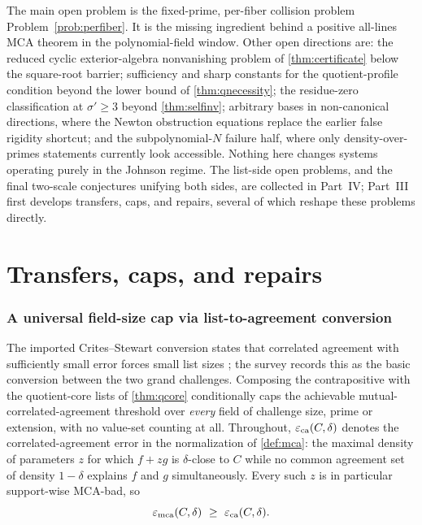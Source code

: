 \documentclass[11pt]{article}
\theoremstyle{definition}
\newcommand{\eps}{\varepsilon}
\newcommand{\emca}{\eps_{\rm mca}}
\newcommand{\eca}{\eps_{\rm ca}}
\begin{document}
The main open problem is the fixed-prime, per-fiber collision problem Problem~\ref{prob:perfiber}.  It is the missing ingredient behind a positive all-lines MCA theorem in the polynomial-field window.  Other open directions are: the reduced cyclic exterior-algebra nonvanishing problem of \cref{thm:certificate} below the square-root barrier; sufficiency and sharp constants for the quotient-profile condition beyond the lower bound of \cref{thm:qnecessity}; the residue-zero classification at $\sigma'\ge3$ beyond \cref{thm:selfinv}; arbitrary bases in non-canonical directions, where the Newton obstruction equations replace the earlier false rigidity shortcut; and the subpolynomial-$N$ failure half, where only density-over-primes statements currently look accessible.  Nothing here changes systems operating purely in the Johnson regime.  The list-side open problems, and the final two-scale conjectures unifying both sides, are collected in Part~IV; Part~III first develops transfers, caps, and repairs, several of which reshape these problems directly.

\part{Transfers, caps, and repairs}

\section{A universal field-size cap via list-to-agreement conversion}\label{sec:cap}

The imported Crites--Stewart conversion states that correlated agreement with sufficiently small error forces small list sizes \cite{CS25}; the survey \cite{ABF26} records this as the basic conversion between the two grand challenges.  Composing the contrapositive with the quotient-core lists of \cref{thm:qcore} conditionally caps the achievable mutual-correlated-agreement threshold over \emph{every} field of challenge size, prime or extension, with no value-set counting at all.  Throughout, $\eca(C,\delta)$ denotes the correlated-agreement error in the normalization of \cref{def:mca}: the maximal density of parameters $z$ for which $f+zg$ is $\delta$-close to $C$ while no common agreement set of density $1-\delta$ explains $f$ and $g$ simultaneously.  Every such $z$ is in particular support-wise MCA-bad, so
\begin{equation}\label{eq:camca}
        \emca(C,\delta)\ \ge\ \eca(C,\delta).
\end{equation}
\end{document}
